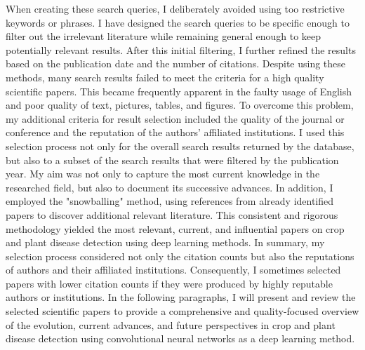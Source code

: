 \documentclass{BachelorBUI}
\begin{document}
When creating these search queries, I deliberately avoided using too restrictive keywords or phrases. I have designed the search queries to be specific enough to filter out the irrelevant literature while remaining general enough to keep potentially relevant results. After this initial filtering, I further refined the results based on the publication date and the number of citations. Despite using these methods, many search results failed to meet the criteria for a high quality scientific papers. This became frequently apparent in the faulty usage of English and poor quality of text, pictures, tables, and figures. To overcome this problem, my additional criteria for result selection included the quality of the journal or conference and the reputation of the authors' affiliated institutions. I used this selection process not only for the overall search results returned by the database, but also to a subset of the search results that were filtered by the publication year. My aim was not only to capture the most current knowledge in the researched field, but also to document its successive advances. In addition, I employed the "snowballing" method, using references from already identified papers to discover additional relevant literature. This consistent and rigorous methodology yielded the most relevant, current, and influential papers on crop and plant disease detection using deep learning methods. In summary, my selection process considered not only the citation counts but also the reputations of authors and their affiliated institutions. Consequently, I sometimes selected papers with lower citation counts if they were produced by highly reputable authors or institutions. In the following paragraphs, I will present and review the selected scientific papers to provide a comprehensive and quality-focused overview of the evolution, current advances, and future perspectives in crop and plant disease detection using convolutional neural networks as a deep learning method.
\end{document}
